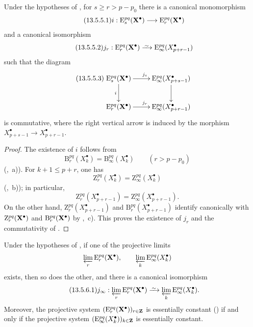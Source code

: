 \begin{lemma}[13.5.5]
\label{0.13.5.5}
Under the hypotheses of , for
$s\geq r>p-p_0$ there is a canonical monomorphism
\begin{equation}
\label{0.13.5.5.1}
\tag{13.5.5.1}
  i:
  \mathrm{E}_s^{pq}(\mathbf{X}^\bullet)
  \longrightarrow
  \mathrm{E}_r^{pq}(\mathbf{X}^\bullet)
\end{equation}
and a canonical isomorphism
\begin{equation}
\label{0.13.5.5.2}
\tag{13.5.5.2}
  j_r:
  \mathrm{E}_r^{pq}(\bb{X}^\bullet)
  \simto
  \mathrm{E}_\infty^{pq}(X^\bullet_{p+r-1})
\end{equation}
such that the diagram
\begin{equation}
\label{0.13.5.5.3}
\tag{13.5.5.3}
  \xymatrix{
    \mathrm{E}_s^{pq}(\bb{X}^\bullet)
      \ar[r]^{j_s}\ar[d]_i
    &
    \mathrm{E}_\infty^{pq}(X^\bullet_{p+s-1})
      \ar[d]
    \\
    \mathrm{E}_r^{pq}(\bb{X}^\bullet)
      \ar[r]^{j_r}
    &
    \mathrm{E}_\infty^{pq}(X^\bullet_{p+r-1})
  }
\end{equation}
is commutative, where the right vertical arrow is induced by the
morphism
$X^\bullet_{p+s-1}\longrightarrow X^\bullet_{p+r-1}$.
\end{lemma}

\begin{proof}
The existence of $i$ follows from
\[
  \mathrm{B}_r^{pq}(X^\bullet_k)
  =
  \mathrm{B}_\infty^{pq}(X^\bullet_k)
  \qquad (r>p-p_0)
\]
(,~a)).
For $k+1\leq p+r$, one has
\[
  \mathrm{Z}_r^{pq}(X^\bullet_k)
  =
  \mathrm{Z}_\infty^{pq}(X^\bullet_k)
\]
(,~b)); in particular,
\[
  \mathrm{Z}_r^{pq}(X^\bullet_{p+r-1})
  =
  \mathrm{Z}_\infty^{pq}(X^\bullet_{p+r-1}).
\]
On the other hand,
$\mathrm{Z}_r^{pq}(X^\bullet_{p+r-1})$ and
$\mathrm{B}_r^{pq}(X^\bullet_{p+r-1})$ identify canonically with
$\mathrm{Z}_r^{pq}(\mathbf{X}^\bullet)$ and
$\mathrm{B}_r^{pq}(\mathbf{X}^\bullet)$ by
,~c).
This proves the existence of $j_r$ and the commutativity of
.
\end{proof}

\begin{corollary}[13.5.6]
\label{0.13.5.6}
Under the hypotheses of , if one of the projective
limits
\[
  \varprojlim_r\mathrm{E}_r^{pq}(\mathbf{X}^\bullet),
  \qquad
  \varprojlim_k\mathrm{E}_\infty^{pq}(X^\bullet_k)
\]
exists, then so does the other, and there is a canonical isomorphism
\begin{equation}
\label{0.13.5.6.1}
\tag{13.5.6.1}
  j_\infty:
  \varprojlim_r\mathrm{E}_r^{pq}(\bb{X}^\bullet)
  \simto
  \varprojlim_k\mathrm{E}_\infty^{pq}(X^\bullet_k).
\end{equation}
Moreover, the projective system
$(\mathrm{E}_r^{pq}(\mathbf{X}^\bullet))_{r\in\mathbf{Z}}$ is essentially
constant () if and only if the projective system
$(\mathrm{E}_\infty^{pq}(X^\bullet_k))_{k\in\mathbf{Z}}$ is essentially
constant.
\end{corollary}

